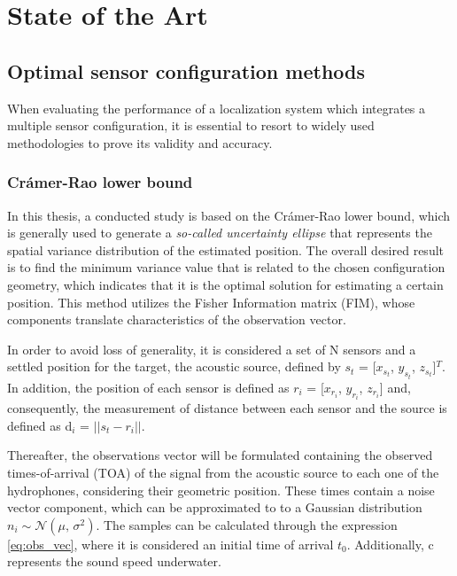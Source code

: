 \chapter{State of the Art} \label{chap:sota}

\section{Optimal sensor configuration methods}

When evaluating the performance of a localization system which integrates a multiple sensor configuration, it is essential to resort to widely used methodologies to prove its validity and accuracy.

\subsection{Crámer-Rao lower bound}	\label{sec:cramer}

In this thesis, a conducted study is based on the Crámer-Rao lower bound, which is generally used to generate a \textit{so-called uncertainty ellipse} \cite{bishop-cramer-rao} that represents the spatial variance distribution of the estimated position. The overall desired result is to find the minimum variance value that is related to the chosen configuration geometry, which indicates that it is the optimal solution for estimating a certain position. This method utilizes the Fisher Information matrix (FIM), whose components translate characteristics of the observation vector.

In order to avoid loss of generality, it is considered a set of N sensors and a settled position for the target, the acoustic source, defined by $s_{t}$ = [$x_{s_{t}}$, $y_{s_{t}}$, $z_{s_{t}}$]$^T$. In addition, the position of each sensor is defined as $r_{i}$ = [$x_{r_{i}}$, $y_{r_{i}}$, $z_{r_{i}}$] and, consequently, the measurement of distance between each sensor and the source is defined as d$_{i}$ = $|| s_{t} - r_{i} ||$.

Thereafter, the observations vector will be formulated containing the observed times-of-arrival (TOA) of the signal from the acoustic source to each one of the hydrophones, considering their geometric position. These times contain a noise vector component, which can be approximated to to a Gaussian distribution $n_i \sim \mathcal{N}(\mu,\,\sigma^{2})$. The samples can be calculated through the expression \ref{eq:obs_vec}, where it is considered an initial time of arrival $t_0$. Additionally, c represents the sound speed underwater.

